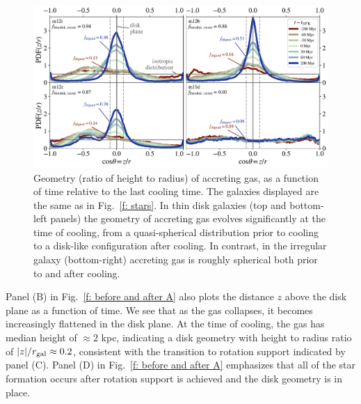 \documentclass[fleqn,usenatbib]{mnras}
\begin{document}
\begin{figure}
    \centering
    \includegraphics[width=\textwidth]{figures/theta_vs_t.pdf}
    \caption{
    Geometry (ratio of height to radius) of accreting gas, as a function of time relative to the last cooling time.
    The galaxies displayed are the same as in Fig.~\ref{f: stars}.
    In thin disk galaxies (top and bottom-left panels) the geometry of accreting gas evolves significantly at the time of cooling, from a quasi-spherical distribution prior to cooling to a disk-like configuration after cooling. 
    In contrast, in the irregular galaxy (bottom-right) accreting gas is roughly spherical both prior to and after cooling.
    }
    \label{f: theta vs t}
\end{figure}

Panel (B) in Fig.~\ref{f: before and after A} also plots the distance $z$ above the disk plane as a function of time.
We see that as the gas collapses, it becomes increasingly flattened in the disk plane.
At the time of cooling, the gas has median height of $\approx 2$ kpc, indicating a disk geometry with height to radius ratio of $\vert z\vert/r_{\rm gal}\approx0.2$, consistent with the transition to rotation support indicated by panel (C).
Panel (D) in Fig.~\ref{f: before and after A} emphasizes that all of the star formation occurs after rotation support is achieved and the disk geometry is in place.
\end{document}
